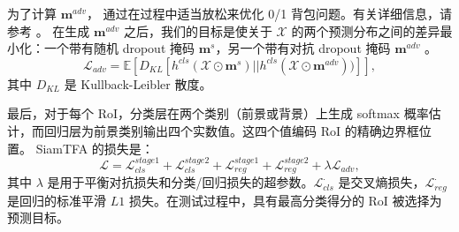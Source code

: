 为了计算 $\mathbf{m}^{adv}$，\cite{park2018adversarial} 通过在过程中适当放松来优化 0/1 背包问题。有关详细信息，请参考 \cite{park2018adversarial}。
在生成 $\mathbf{m}^{adv}$ 之后，我们的目标是使关于 $\mathcal{X}$ 的两个预测分布之间的差异最小化：一个带有随机 dropout 掩码 $\mathbf{m}^{s}$，另一个带有对抗 dropout 掩码 $\mathbf{m}^{adv}$ \cite{lee2019drop}。
\begin{equation}
    \mathcal{L}_{adv} = \mathbb E[D_{KL}[h^{cls}(\mathcal{X} \odot\mathbf{m}^{s})||h^{cls}(\mathcal{X} \odot\mathbf{m}^{adv}))]],
\end{equation}
其中 $D_{KL}$ 是 Kullback-Leibler 散度。

最后，对于每个 RoI，分类层在两个类别（前景或背景）上生成 softmax 概率估计，而回归层为前景类别输出四个实数值。这四个值编码 RoI 的精确边界框位置。
SiamTFA 的损失是：
\begin{equation}
\mathcal{L} = \mathcal{L}_{cls}^{stage1} + \mathcal{L}_{cls}^{stage2} + \mathcal{L}_{reg}^{stage1}+\mathcal{L}_{reg}^{stage2} +  \lambda \mathcal{L}_{adv},
\end{equation}
其中 $\lambda$ 是用于平衡对抗损失和分类/回归损失的超参数。$\mathcal{L}_{cls}^{\cdot}$ 是交叉熵损失，$\mathcal{L}_{reg}^{\cdot}$ 是回归的标准平滑 $L1$ 损失。在测试过程中，具有最高分类得分的 RoI 被选择为预测目标。

